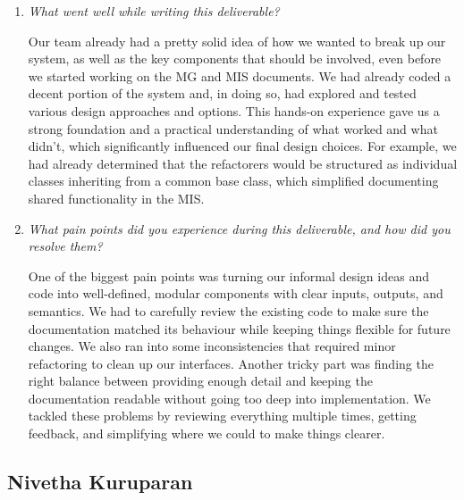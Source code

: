 \documentclass[12pt, titlepage]{article}
\begin{document}
\begin{enumerate}
  \item \textit{What went well while writing this deliverable? }

  Our team already had a pretty solid idea of how we wanted to break up our system, as well as the key components that should be involved, even before we started working on the MG and MIS documents. We had already coded a decent portion of the system and, in doing so, had explored and tested various design approaches and options. This hands-on experience gave us a strong foundation and a practical understanding of what worked and what didn’t, which significantly influenced our final design choices. For example, we had already determined that the refactorers would be structured as individual classes inheriting from a common base class, which simplified documenting shared functionality in the MIS.

  \item \textit{What pain points did you experience during this deliverable, and how did you resolve them?}
  
  One of the biggest pain points was turning our informal design ideas and code into well-defined, modular components with clear inputs, outputs, and semantics. We had to carefully review the existing code to make sure the documentation matched its behaviour while keeping things flexible for future changes. We also ran into some inconsistencies that required minor refactoring to clean up our interfaces. Another tricky part was finding the right balance between providing enough detail and keeping the documentation readable without going too deep into implementation. We tackled these problems by reviewing everything multiple times, getting feedback, and simplifying where we could to make things clearer.

\end{enumerate}

\subsection*{Nivetha Kuruparan}
\end{document}
